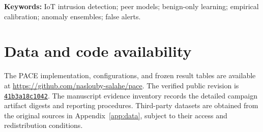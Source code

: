 \documentclass[11pt]{article}
\begin{document}
\noindent\textbf{Keywords:} IoT intrusion detection; peer models; benign-only learning; empirical calibration; anomaly ensembles; false alerts.




\FloatBarrier





\clearpage
\appendix
\renewcommand{\theHtable}{\Alph{section}.\arabic{table}}
\renewcommand{\thetable}{\Alph{section}.\arabic{table}}


\section*{Data and code availability}
The PACE implementation, configurations, and frozen result tables are available at \url{https://github.com/naslouby-salahe/pace}. The verified public revision is \href{https://github.com/naslouby-salahe/pace/tree/41b3a18c10422fc41d1785c35881ccd6323941fa}{\texttt{41b3a18c1042}}. The manuscript evidence inventory records the detailed campaign artifact digests and reporting procedures. Third-party datasets are obtained from the original sources in Appendix~\ref{app:data}, subject to their access and redistribution conditions.
\setlength{\bibsep}{0pt}
\small


\end{document}
